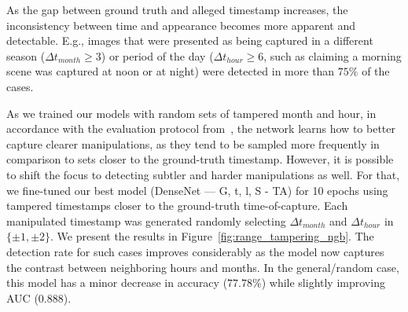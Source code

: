 \documentclass[journal]{IEEEtran}
\begin{document}
        As the gap between ground truth and alleged timestamp increases, the inconsistency between time and appearance becomes more apparent and detectable. E.g., images that were presented as being captured in a different season ($\Delta t_{month} \geq 3$) or period of the day ($\Delta t_{hour} \geq 6$, such as claiming a morning scene was captured at noon or at night) were detected in more than $75\%$ of the cases.
        
        As we trained our models with random sets of tampered month and hour, in accordance with the evaluation protocol from~\cite{salem2020learning}, the network learns how to better capture clearer manipulations, as they tend to be sampled more frequently in comparison to sets closer to the ground-truth timestamp. However, it is possible to shift the focus to detecting subtler and harder manipulations as well. For that, we fine-tuned our best model (DenseNet — G, t, l, S - TA) for 10 epochs using tampered timestamps closer to the ground-truth time-of-capture. Each manipulated timestamp was generated randomly selecting $\Delta t_{month}$ and $\Delta t_{hour}$ in $\{\pm1, \pm2\}$. We present the results in Figure~\ref{fig:range_tampering_ngb}. The detection rate for such cases improves considerably as the model now captures the contrast between neighboring hours and months. In the general/random case, this model has a minor decrease in accuracy ($77.78\%$) while slightly improving AUC ($0.888$).
        
         
        
\end{document}
